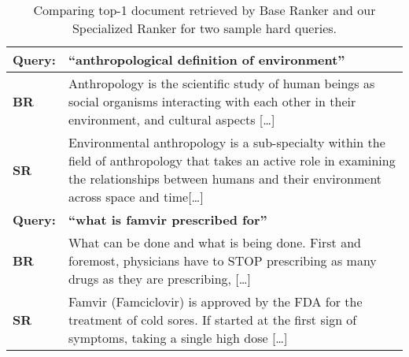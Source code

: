 \begin{table*}[hbt!]
\begin{tabular}{lp{}}
\midrule
\textbf{Query:}  & \textbf{``anthropological definition of environment''}\\
\midrule
\textbf{BR} & Anthropology is the scientific study of human beings as social organisms interacting with each other in their environment, and cultural aspects [\dots] \\
\textbf{SR} & Environmental anthropology is a sub-specialty within the field of anthropology that takes an active role in examining the relationships between humans and their environment across space and time[\dots] \\
\midrule
\textbf{Query:}  & \textbf{``what is famvir prescribed for''}\\
\midrule
\textbf{BR} & What can be done and what is being done. First and foremost, physicians have to STOP prescribing as many drugs as they are prescribing, [\dots]\\
\textbf{SR}  & Famvir (Famciclovir) is approved by the FDA for the treatment of cold sores. If started at the first sign of symptoms, taking a single high dose [\dots]\\
\midrule
\end{tabular}
\caption{Comparing top-1 document retrieved by Base Ranker and our Specialized Ranker for two sample hard queries.}
\label{tab:intro_anecdotal}
\vspace{-5mm}
\end{table*}
